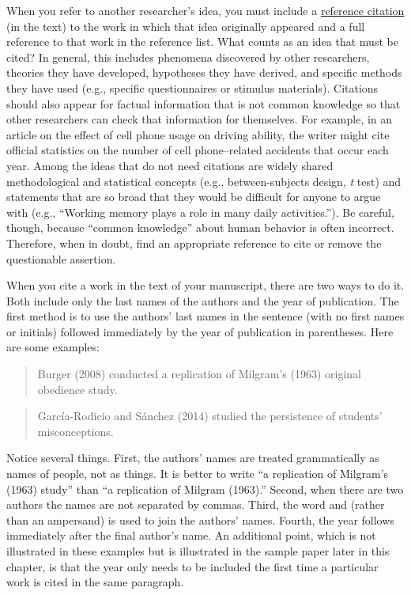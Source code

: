 \documentclass[
]{krantz}
\begin{document}
When you refer to another researcher's idea, you must include a \protect\hyperlink{reference-citation}{reference citation} (in the text) to the work in which that idea originally appeared and a full reference to that work in the reference list. What counts as an idea that must be cited? In general, this includes phenomena discovered by other researchers, theories they have developed, hypotheses they have derived, and specific methods they have used (e.g., specific questionnaires or stimulus materials). Citations should also appear for factual information that is not common knowledge so that other researchers can check that information for themselves. For example, in an article on the effect of cell phone usage on driving ability, the writer might cite official statistics on the number of cell phone--related accidents that occur each year. Among the ideas that do not need citations are widely shared methodological and statistical concepts (e.g., between-subjects design, \emph{t} test) and statements that are so broad that they would be difficult for anyone to argue with (e.g., ``Working memory plays a role in many daily activities.''). Be careful, though, because ``common knowledge'' about human behavior is often incorrect. Therefore, when in doubt, find an appropriate reference to cite or remove the questionable assertion.

When you cite a work in the text of your manuscript, there are two ways to do it. Both include only the last names of the authors and the year of publication. The first method is to use the authors' last names in the sentence (with no first names or initials) followed immediately by the year of publication in parentheses. Here are some examples:

\begin{quote}
Burger (2008) conducted a replication of Milgram's (1963) original obedience study.
\end{quote}

\begin{quote}
García-Rodicio and Sánchez (2014) studied the persistence of students' misconceptions.
\end{quote}

Notice several things. First, the authors' names are treated grammatically as names of people, not as things. It is better to write ``a replication of Milgram's (1963) study'' than ``a replication of Milgram (1963).'' Second, when there are two authors the names are not separated by commas. Third, the word and (rather than an ampersand) is used to join the authors' names. Fourth, the year follows immediately after the final author's name. An additional point, which is not illustrated in these examples but is illustrated in the sample paper later in this chapter, is that the year only needs to be included the first time a particular work is cited in the same paragraph.
\end{document}
